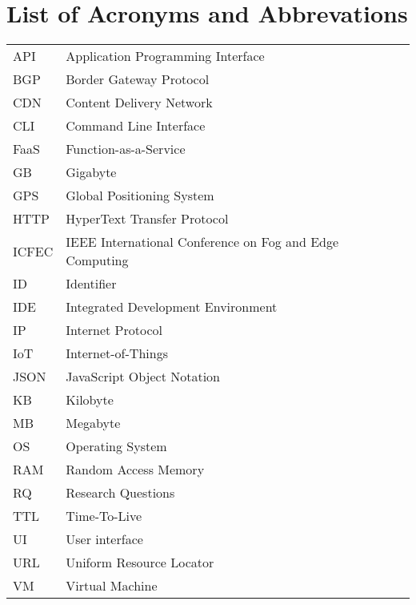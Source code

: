 \chapter*{List of Acronyms and Abbrevations}
\begin{tabularx}{\textwidth}{XX}
API    & Application Programming Interface                         \\[3pt]
BGP    & Border Gateway Protocol                                   \\[3pt]
CDN    & Content Delivery Network                                  \\[3pt]
CLI    & Command Line Interface                                    \\[3pt]
FaaS   & Function-as-a-Service                                     \\[3pt]
GB     & Gigabyte                                                  \\[3pt]
GPS    & Global Positioning System                                 \\[3pt]
HTTP   & HyperText Transfer Protocol                               \\[3pt]
ICFEC  & IEEE International Conference on Fog and Edge Computing   \\[3pt]
ID     & Identifier                                                \\[3pt]
IDE    & Integrated Development Environment                        \\[3pt]
IP     & Internet Protocol                                         \\[3pt]
IoT    & Internet-of-Things                                        \\[3pt]
JSON   & JavaScript Object Notation                                \\[3pt]
KB     & Kilobyte                                                  \\[3pt]
MB     & Megabyte                                                  \\[3pt]
OS     & Operating System                                          \\[3pt]
RAM    & Random Access Memory                                      \\[3pt]
RQ     & Research Questions                                        \\[3pt]
TTL    & Time-To-Live                                              \\[3pt]
UI     & User interface                                            \\[3pt]
URL    & Uniform Resource Locator                                  \\[3pt]
VM     & Virtual Machine                                           \\[3pt]
\end{tabularx}
